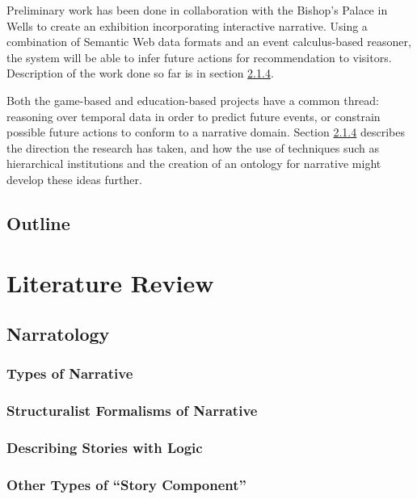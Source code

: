 \documentclass[11pt]{report}
\begin{document}
Preliminary work has been done in collaboration with the Bishop's Palace in Wells to create an exhibition incorporating interactive narrative. Using a combination of Semantic Web data formats and an event calculus-based reasoner, the system will be able to infer future actions for recommendation to visitors. Description of the work done so far is in section \ref{}.

Both the game-based and education-based projects have a common thread: reasoning
over temporal data in order to predict future events, or constrain possible
future actions to conform to a narrative domain. Section \ref{}
describes the direction the research has taken, and how the use of techniques such as hierarchical institutions and the creation of an ontology for narrative might develop these ideas further.

\section{Outline}


\chapter{Literature Review}
\label{cha:literature-review}

\section{Narratology}
\label{sec:narratology}

\subsection{Types of Narrative}

\subsection{Structuralist Formalisms of Narrative}

\subsection{Describing Stories with Logic}

\subsection{Other Types of ``Story Component''}
\end{document}
